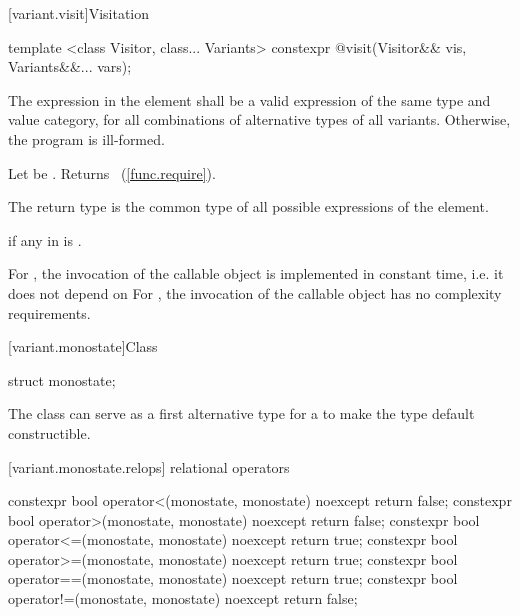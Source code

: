 [variant.visit]{Visitation}

%
%
\begin{itemdecl}
template <class Visitor, class... Variants>
  constexpr @\seebelow@ visit(Visitor&& vis, Variants&&... vars);
\end{itemdecl}

\begin{itemdescr}
\pnum
\requires
The expression in the \effects element shall be a valid expression of the same
 type and value category, for all combinations of alternative types of all
 variants. Otherwise, the program is ill-formed.

\pnum
\effects
Let  be . Returns \brk{}
~(\ref{func.require}).

\pnum
\remarks
The return type is the common type of all possible 
expressions of the \effects element.

\pnum
\throws
{} if any  in  is .

\pnum
\complexity
For , the invocation of the callable object is
implemented in constant time, i.e. it does not depend on 
For , the invocation of the callable object has
no complexity requirements.
\end{itemdescr}

%
[variant.monostate]{Class }

\begin{itemdecl}
struct monostate{};
\end{itemdecl}

\begin{itemdescr}
\pnum
The class  can serve as a first alternative type for
a  to make the  type default constructible.
\end{itemdescr}


[variant.monostate.relops]{ relational operators}

%
%
%
%
%
%
\begin{itemdecl}
constexpr bool operator<(monostate, monostate) noexcept { return false; }
constexpr bool operator>(monostate, monostate) noexcept { return false; }
constexpr bool operator<=(monostate, monostate) noexcept { return true; }
constexpr bool operator>=(monostate, monostate) noexcept { return true; }
constexpr bool operator==(monostate, monostate) noexcept { return true; }
constexpr bool operator!=(monostate, monostate) noexcept { return false; }
\end{itemdecl}

